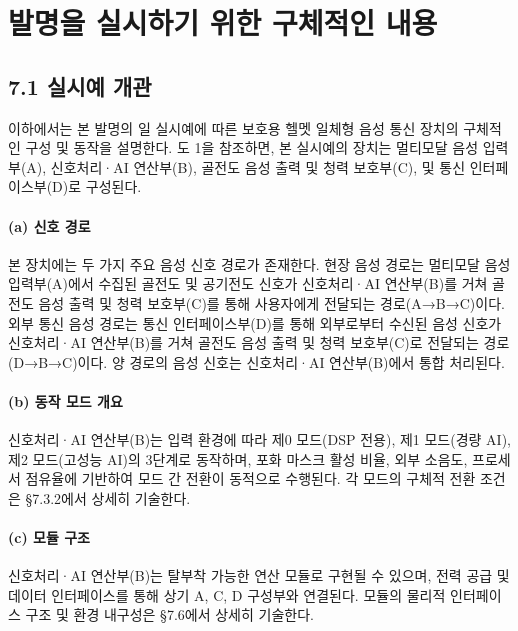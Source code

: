 \documentclass{article}
\begin{document}
\section{발명을 실시하기 위한 구체적인 내용}


\subsection{7.1 실시예 개관}

이하에서는 본 발명의 일 실시예에 따른 보호용 헬멧 일체형 음성 통신 장치의 구체적인 구성 및 동작을 설명한다. 도 1을 참조하면, 본 실시예의 장치는 멀티모달 음성 입력부(A), 신호처리·AI 연산부(B), 골전도 음성 출력 및 청력 보호부(C), 및 통신 인터페이스부(D)로 구성된다.

\paragraph{(a) 신호 경로}

본 장치에는 두 가지 주요 음성 신호 경로가 존재한다. 현장 음성 경로는 멀티모달 음성 입력부(A)에서 수집된 골전도 및 공기전도 신호가 신호처리·AI 연산부(B)를 거쳐 골전도 음성 출력 및 청력 보호부(C)를 통해 사용자에게 전달되는 경로(A→B→C)이다. 외부 통신 음성 경로는 통신 인터페이스부(D)를 통해 외부로부터 수신된 음성 신호가 신호처리·AI 연산부(B)를 거쳐 골전도 음성 출력 및 청력 보호부(C)로 전달되는 경로(D→B→C)이다. 양 경로의 음성 신호는 신호처리·AI 연산부(B)에서 통합 처리된다.

\paragraph{(b) 동작 모드 개요}

신호처리·AI 연산부(B)는 입력 환경에 따라 제0 모드(DSP 전용), 제1 모드(경량 AI), 제2 모드(고성능 AI)의 3단계로 동작하며, 포화 마스크 활성 비율, 외부 소음도, 프로세서 점유율에 기반하여 모드 간 전환이 동적으로 수행된다. 각 모드의 구체적 전환 조건은 §7.3.2에서 상세히 기술한다.

\paragraph{(c) 모듈 구조}

신호처리·AI 연산부(B)는 탈부착 가능한 연산 모듈로 구현될 수 있으며, 전력 공급 및 데이터 인터페이스를 통해 상기 A, C, D 구성부와 연결된다. 모듈의 물리적 인터페이스 구조 및 환경 내구성은 §7.6에서 상세히 기술한다.
\end{document}
